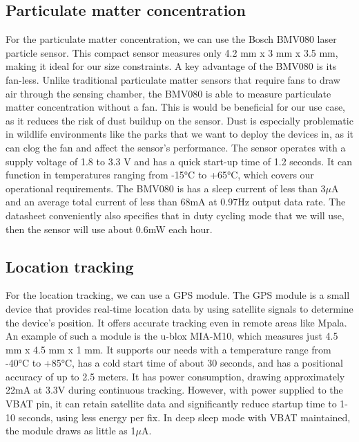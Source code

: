 \subsection{Particulate matter concentration}
For the particulate matter concentration, we can use the Bosch BMV080 laser particle sensor. This compact sensor measures only 4.2 mm x 3 mm x 3.5 mm, making it ideal for our size constraints. A key advantage of the BMV080 is its fan-less. Unlike traditional particulate matter sensors that require fans to draw air through the sensing chamber, the BMV080 is able to measure particulate matter concentration without a fan. This is would be beneficial for our use case, as it reduces the risk of dust buildup on the sensor. Dust is especially problematic in wildlife environments like the parks that we want to deploy the devices in, as it can clog the fan and affect the sensor's performance. The sensor operates with a supply voltage of 1.8 to 3.3 V and has a quick start-up time of 1.2 seconds. It can function in temperatures ranging from -15°C to +65°C, which covers our operational requirements. The BMV080 is has a sleep current of less than 3$\mu$A and an average total current of less than 68mA at 0.97Hz output data rate.
The datasheet conveniently also specifies that in duty cycling mode that we will use, then the sensor will use about 0.6mW each hour. 


\subsection{Location tracking}
For the location tracking, we can use a GPS module. The GPS module is a small device that provides real-time location data by using satellite signals to determine the device's position. It offers accurate tracking even in remote areas like Mpala. An example of such a module is the u-blox MIA-M10, which measures just 4.5 mm x 4.5 mm x 1 mm. It supports our needs with a temperature range from -40°C to +85°C, has a cold start time of about 30 seconds, and has a positional accuracy of up to 2.5 meters. It has power consumption, drawing approximately 22mA at 3.3V during continuous tracking. However, with power supplied to the VBAT pin, it can retain satellite data and significantly reduce startup time to 1-10 seconds, using less energy per fix. In deep sleep mode with VBAT maintained, the module draws as little as 1$\mu$A.

